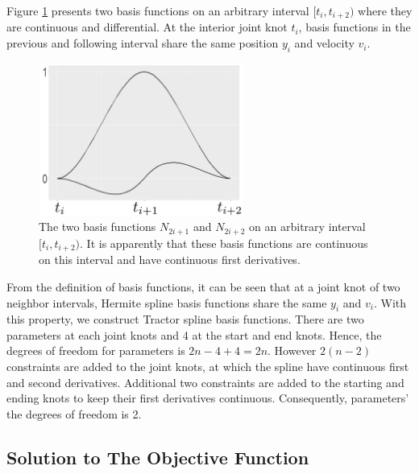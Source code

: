 Figure \ref{basisfigure} presents two basis functions on an arbitrary interval $[t_i, t_{i+2} )$ where they are continuous and differential. At the interior joint knot $t_i$, basis functions in the previous and following interval share the same position $y_i$ and velocity $v_i$. 
\begin{figure}[h] 
\centering
\includegraphics[width=0.6\textwidth, height=5cm]{Chapters/02TractorSplineTheory/plot/pptbasisplot2.pdf}
\caption{The two basis functions $N_{2i+1}$ and $N_{2i+2}$ on an arbitrary interval $[t_i, t_{i+2})$. It is apparently that these basis functions are continuous on this interval and have continuous first derivatives.}
\label{basisfigure}
\end{figure}


From the definition of basis functions, it can be seen that at a joint knot of two neighbor intervals, Hermite spline basis functions share the same $y_i$ and $v_i$. With this property, we construct Tractor spline basis functions. There are two parameters at each joint knots and 4 at the start and end knots. Hence, the degrees of freedom for parameters is $2n-4+4=2n$. However $2(n-2)$ constraints are added to the joint knots, at which the spline have continuous first and second derivatives. Additional two constraints are added to the starting and ending knots to keep their first derivatives continuous. Consequently, parameters' the degrees of freedom is 2. 


\subsection{Solution to The Objective Function}

